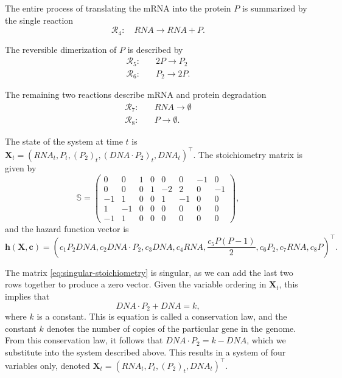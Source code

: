 The entire process of translating the mRNA into the protein $P$ is summarized by the single reaction
\begin{equation*}
\mathcal{R}_4:\quad \mathit{RNA} \to \mathit{RNA} + P.
\end{equation*}

The reversible dimerization of $P$ is described by
\begin{equation*}
\begin{split}
\mathcal{R}_5:\quad & 2P \to P_2 \\
\mathcal{R}_6:\quad & P_2 \to 2P.
\end{split}
\end{equation*}

The remaining two reactions describe mRNA and protein degradation
\begin{equation*}
\begin{split}
\mathcal{R}_7:\quad & \mathit{RNA} \to \emptyset \\
\mathcal{R}_8:\quad & P \to \emptyset.
\end{split}
\end{equation*}

The state of the system at time $t$ is $\bm{X}_t = \left(\mathit{RNA}_t, P_t, (P_2)_t, (\mathit{DNA} \cdot P_2)_t, \mathit{DNA}_t\right)^\intercal$. The stoichiometry matrix is given by
\begin{equation} \label{eq:singular-stoichiometry}
\mathbb{S} = \begin{pmatrix}
0 & 0 & 1 & 0 & 0 & 0 & -1 & 0 \\
0 & 0 & 0 & 1 & -2 & 2 & 0 & -1 \\
-1 & 1 & 0 & 0 & 1 & -1 & 0 & 0 \\
1 & -1 & 0 & 0 & 0 & 0 & 0 & 0 \\
-1 & 1 & 0 & 0 & 0 & 0 & 0 & 0
\end{pmatrix},
\end{equation}
and the hazard function vector is \citep{wilkinson}
\begin{equation*}
\bm{h}(\bm{X}, \bm{c}) = \left(c_1 P_2 \mathit{DNA}, c_2 \mathit{DNA} \cdot P_2, c_3 \mathit{DNA}, c_4 \mathit{RNA}, \frac{c_5 P(P-1)}{2}, c_6 P_2, c_7 \mathit{RNA}, c_8 P \right)^\intercal.
\end{equation*}

The matrix \eqref{eq:singular-stoichiometry} is singular, as we can add the last two rows together to produce a zero vector. Given the variable ordering in $\bm{X}_t$, this implies that
\begin{equation*}
\mathit{DNA} \cdot P_2 + \mathit{DNA} = k,
\end{equation*}
where $k$ is a constant. This is equation is called a conservation law, and the constant $k$ denotes the number of copies of the particular gene in the genome. From this conservation law, it follows that $\mathit{DNA} \cdot P_2 = k - \mathit{DNA}$, which we substitute into the system described above. This results in a system of four variables only, denoted ${\bm{X}_t = \left(\mathit{RNA}_t, P_t, (P_2)_t, \mathit{DNA}_t\right)^\intercal}$.

